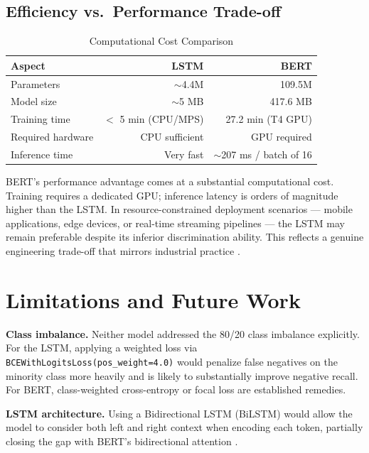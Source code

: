 \documentclass[11pt, a4paper]{article}
\begin{document}
\subsection{Efficiency vs.\ Performance Trade-off}

\begin{table}[h]
\centering
\caption{Computational Cost Comparison}
\begin{tabular}{lrr}
\toprule
\textbf{Aspect} & \textbf{LSTM} & \textbf{BERT} \\
\midrule
Parameters          & $\sim$4.4M              & 109.5M \\
Model size          & $\sim$5 MB              & 417.6 MB \\
Training time       & $<$ 5 min (CPU/MPS)     & 27.2 min (T4 GPU) \\
Required hardware   & CPU sufficient          & GPU required \\
Inference time      & Very fast               & $\sim$207 ms / batch of 16 \\
\bottomrule
\end{tabular}
\end{table}

BERT's performance advantage comes at a substantial computational cost. Training requires a dedicated GPU; inference latency is orders of magnitude higher than the LSTM. In resource-constrained deployment scenarios --- mobile applications, edge devices, or real-time streaming pipelines --- the LSTM may remain preferable despite its inferior discrimination ability. This reflects a genuine engineering trade-off that mirrors industrial practice \cite{zhang2018deep}.

\section{Limitations and Future Work}

\textbf{Class imbalance.} Neither model addressed the 80/20 class imbalance explicitly. For the LSTM, applying a weighted loss via \texttt{BCEWithLogitsLoss(pos\_weight=4.0)} would penalize false negatives on the minority class more heavily and is likely to substantially improve negative recall. For BERT, class-weighted cross-entropy or focal loss \cite{zhang2018deep} are established remedies.

\textbf{LSTM architecture.} Using a Bidirectional LSTM (BiLSTM) would allow the model to consider both left and right context when encoding each token, partially closing the gap with BERT's bidirectional attention \cite{zhang2018deep}.
\end{document}

